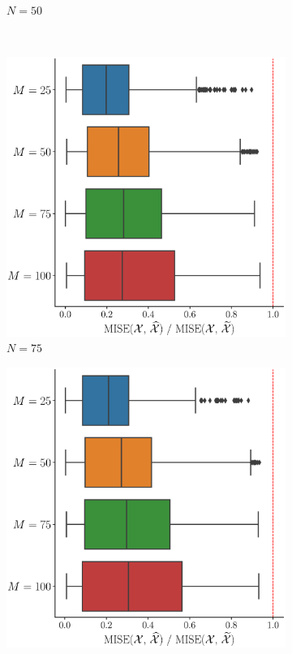 \begin{results}
\begin{figure}
\begin{subfigure}[b]{0.49\textwidth}
         \caption{$N = 50$}
         \label{fig:mise_mfd_2d_50}
     \end{subfigure}
     \\
     \begin{subfigure}[b]{0.49\textwidth}
         \centering
         \includegraphics[width=\textwidth]{figures/scenario_2/mise_N75.eps}
         \caption{$N = 75$}
         \label{fig:mise_mfd_2d_75}
     \end{subfigure}
     \begin{subfigure}[b]{0.49\textwidth}
         \centering
         \includegraphics[width=\textwidth]{figures/scenario_2/mise_N100.eps}

\end{subfigure}
\end{figure}
\end{results}

